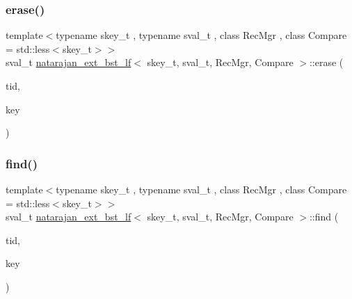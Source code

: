 \mbox{\label{classnatarajan__ext__bst__lf_a4e26b944d7a22b38c367a5a9272a65df}} 
\subsubsection{\texorpdfstring{erase()}{erase()}\hspace{0.1cm}{\footnotesize\ttfamily [2/2]}}
{\footnotesize\ttfamily template$<$typename skey\+\_\+t , typename sval\+\_\+t , class Rec\+Mgr , class Compare  = std\+::less$<$skey\+\_\+t$>$$>$ \\
sval\+\_\+t \hyperlink{classnatarajan__ext__bst__lf}{natarajan\+\_\+ext\+\_\+bst\+\_\+lf}$<$ skey\+\_\+t, sval\+\_\+t, Rec\+Mgr, Compare $>$\+::erase (\begin{DoxyParamCaption}\item[{const int}]{tid,  }\item[{skey\+\_\+t}]{key }\end{DoxyParamCaption})\hspace{0.3cm}{\ttfamily [inline]}}

\mbox{\label{classnatarajan__ext__bst__lf_aaca04e90b6cd390c3cf5701a08bcdb51}} 
\subsubsection{\texorpdfstring{find()}{find()}\hspace{0.1cm}{\footnotesize\ttfamily [1/2]}}
{\footnotesize\ttfamily template$<$typename skey\+\_\+t , typename sval\+\_\+t , class Rec\+Mgr , class Compare  = std\+::less$<$skey\+\_\+t$>$$>$ \\
sval\+\_\+t \hyperlink{classnatarajan__ext__bst__lf}{natarajan\+\_\+ext\+\_\+bst\+\_\+lf}$<$ skey\+\_\+t, sval\+\_\+t, Rec\+Mgr, Compare $>$\+::find (\begin{DoxyParamCaption}\item[{const int}]{tid,  }\item[{skey\+\_\+t}]{key }\end{DoxyParamCaption})\hspace{0.3cm}{\ttfamily [inline]}}

